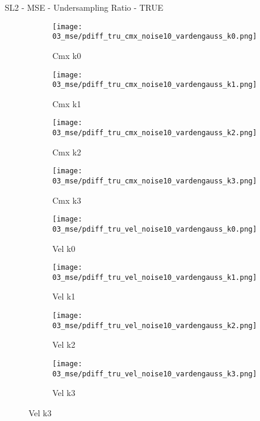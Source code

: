 \documentclass{beamer}
\begin{document}
\begin{frame}{SL2 - MSE - Undersampling Ratio - TRUE}{}
\begin{figure}
\begin{subfigure}{0.24\textwidth}
\texttt{[image: 03\_mse/pdiff\_tru\_cmx\_noise10\_vardengauss\_k0.png]}
\vspace{-20pt}
\caption*{\tiny Cmx k0}
\end{subfigure}
\begin{subfigure}{0.24\textwidth}
\texttt{[image: 03\_mse/pdiff\_tru\_cmx\_noise10\_vardengauss\_k1.png]}
\vspace{-20pt}
\caption*{\tiny Cmx k1}
\end{subfigure}
\begin{subfigure}{0.24\textwidth}
\texttt{[image: 03\_mse/pdiff\_tru\_cmx\_noise10\_vardengauss\_k2.png]}
\vspace{-20pt}
\caption*{\tiny Cmx k2}
\end{subfigure}
\begin{subfigure}{0.24\textwidth}
\texttt{[image: 03\_mse/pdiff\_tru\_cmx\_noise10\_vardengauss\_k3.png]}
\vspace{-20pt}
\caption*{\tiny Cmx k3}
\end{subfigure}

\begin{subfigure}{0.24\textwidth}
\texttt{[image: 03\_mse/pdiff\_tru\_vel\_noise10\_vardengauss\_k0.png]}
\vspace{-20pt}
\caption*{\tiny Vel k0}
\end{subfigure}
\begin{subfigure}{0.24\textwidth}
\texttt{[image: 03\_mse/pdiff\_tru\_vel\_noise10\_vardengauss\_k1.png]}
\vspace{-20pt}
\caption*{\tiny Vel k1}
\end{subfigure}
\begin{subfigure}{0.24\textwidth}
\texttt{[image: 03\_mse/pdiff\_tru\_vel\_noise10\_vardengauss\_k2.png]}
\vspace{-20pt}
\caption*{\tiny Vel k2}
\end{subfigure}
\begin{subfigure}{0.24\textwidth}
\texttt{[image: 03\_mse/pdiff\_tru\_vel\_noise10\_vardengauss\_k3.png]}
\vspace{-20pt}
\caption*{\tiny Vel k3}
\end{subfigure}
\end{figure}
\end{frame}
\end{document}

